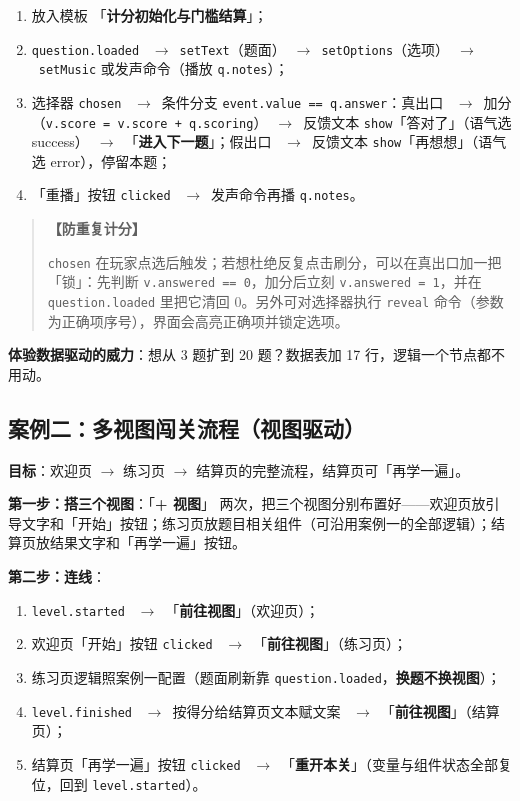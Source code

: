 \documentclass[UTF8,a4paper,zihao=-4]{ctexart}
\newcommand{\code}[1]{\texttt{#1}}   %
\newcommand{\ui}[1]{「\textbf{#1}」}  %
\newcommand{\ra}{\ $\rightarrow$\ }  %
\newenvironment{tip}[1][提示]{%
  \begin{quote}\small\textbf{【#1】}\ignorespaces
}{\end{quote}}
\begin{document}
\begin{enumerate}[nosep]
  \item 放入模板 \ui{计分初始化与门槛结算}；
  \item \code{question.loaded} \ra \code{setText}（题面）\ra \code{setOptions}（选项）\ra \code{setMusic} 或发声命令（播放 \code{q.notes}）；
  \item 选择器 \code{chosen} \ra 条件分支 \code{event.value == q.answer}：真出口 \ra 加分（\code{v.score = v.score + q.scoring}）\ra 反馈文本 \code{show}「答对了」（语气选 success）\ra \ui{进入下一题}；假出口 \ra 反馈文本 \code{show}「再想想」（语气选 error），停留本题；
  \item 「重播」按钮 \code{clicked} \ra 发声命令再播 \code{q.notes}。
\end{enumerate}

\begin{tip}[防重复计分]
\code{chosen} 在玩家点选后触发；若想杜绝反复点击刷分，可以在真出口加一把「锁」：先判断 \code{v.answered == 0}，加分后立刻 \code{v.answered = 1}，并在 \code{question.loaded} 里把它清回 0。另外可对选择器执行 \code{reveal} 命令（参数为正确项序号），界面会高亮正确项并锁定选项。
\end{tip}

\textbf{体验数据驱动的威力}：想从 3 题扩到 20 题？数据表加 17 行，逻辑一个节点都不用动。

\subsection{案例二：多视图闯关流程（视图驱动）}

\textbf{目标}：欢迎页 $\rightarrow$ 练习页 $\rightarrow$ 结算页的完整流程，结算页可「再学一遍」。

\textbf{第一步：搭三个视图}：\ui{+ 视图} 两次，把三个视图分别布置好——欢迎页放引导文字和「开始」按钮；练习页放题目相关组件（可沿用案例一的全部逻辑）；结算页放结果文字和「再学一遍」按钮。

\textbf{第二步：连线}：

\begin{enumerate}[nosep]
  \item \code{level.started} \ra \ui{前往视图}（欢迎页）；
  \item 欢迎页「开始」按钮 \code{clicked} \ra \ui{前往视图}（练习页）；
  \item 练习页逻辑照案例一配置（题面刷新靠 \code{question.loaded}，\textbf{换题不换视图}）；
  \item \code{level.finished} \ra 按得分给结算页文本赋文案 \ra \ui{前往视图}（结算页）；
  \item 结算页「再学一遍」按钮 \code{clicked} \ra \ui{重开本关}（变量与组件状态全部复位，回到 \code{level.started}）。
\end{enumerate}
\end{document}

